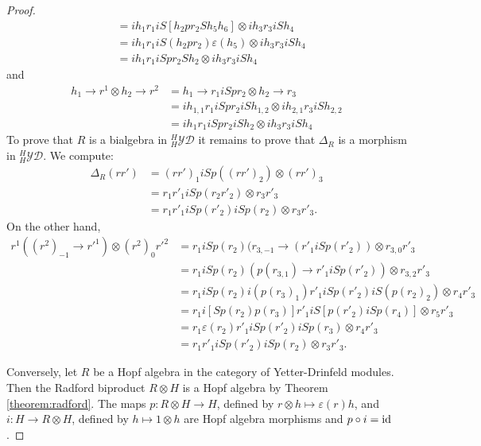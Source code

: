\begin{proof}
\begin{align*}
 & =ih_{1}r_{1}iS[h_{2}pr_{2}Sh_{5}h_{6}]\otimes ih_{3}r_{3}iSh_{4}\\
 & =ih_{1}r_{1}iS(h_{2}pr_{2})\varepsilon(h_{5})\otimes ih_{3}r_{3}iSh_{4}\\
 & =ih_{1}r_{1}iSpr_{2}Sh_{2}\otimes ih_{3}r_{3}iSh_{4}\end{align*}
and 
\begin{align*}
h_{1}\to r^{1}\otimes h_{2}\to r^{2} & = h_{1}\to r_{1}iSpr_{2}\otimes h_{2}\to r_{3}\\
 & = ih_{1,1}r_{1}iSpr_{2}iSh_{1,2}\otimes ih_{2,1}r_{3}iSh_{2,2}\\
 & = ih_{1}r_{1}iSpr_{2}iSh_{2}\otimes ih_{3}r_{3}iSh_{4}
\end{align*}
To prove that $R$ is a bialgebra in $_{H}^{H}\mathcal{YD}$ it remains
to prove that $\Delta_{R}$ is a morphism in $_{H}^{H}\mathcal{YD}$.
We compute: 
\begin{align*}
\Delta_{R}(rr') & = (rr')_{1}iSp((rr')_{2})\otimes(rr')_{3}\\
 & = r_{1}r'_{1}iSp(r_{2}r'_{2})\otimes r_{3}r'_{3}\\
 & = r_{1}r'_{1}iSp(r'_{2})iSp(r_{2})\otimes r_{3}r'_{3}.
\end{align*}
On the other hand,
\begin{align*}
r^{1}((r^{2})_{-1}\to r'^{1})\otimes(r^{2})_{0}r'^{2} &=r_{1}iSp(r_{2})(r_{3,-1}\to(r'_{1}iSp(r'_{2}))\otimes r_{3,0}r'_{3}\\
 &=r_{1}iSp(r_{2})(p(r_{3,1})\to r'_{1}iSp(r'_{2}))\otimes r_{3,2}r'_{3}\\
 &=r_{1}iSp(r_{2})i(p(r_{3})_{1})r'_{1}iSp(r'_{2})iS(p(r_{2})_{2})\otimes r_{4}r'_{3}\\
 &=r_{1}i[Sp(r_{2})p(r_{3})]r'_{1}iS[p(r'_{2})iSp(r_{4})]\otimes r_{5}r'_{3}\\
 &=r_{1}\varepsilon(r_{2})r'_{1}iSp(r'_{2})iSp(r_{3})\otimes r_{4}r'_{3}\\
 &=r_{1}r'_{1}iSp(r'_{2})iSp(r_{2})\otimes r_{3}r'_{3}.
\end{align*}

Conversely, let $R$ be a Hopf algebra in the category of Yetter-Drinfeld
modules. Then the Radford biproduct $R\otimes H$ is a Hopf algebra by Theorem
\ref{theorem:radford}. The maps $p:R\otimes H\to H$, defined by $r\otimes
h\mapsto\varepsilon(r)h$, and $i:H\to R\otimes H$, defined by $h\mapsto
1\otimes h$ are Hopf algebra morphisms and $p\circ i=\mathrm{id}$. 
\end{proof}

